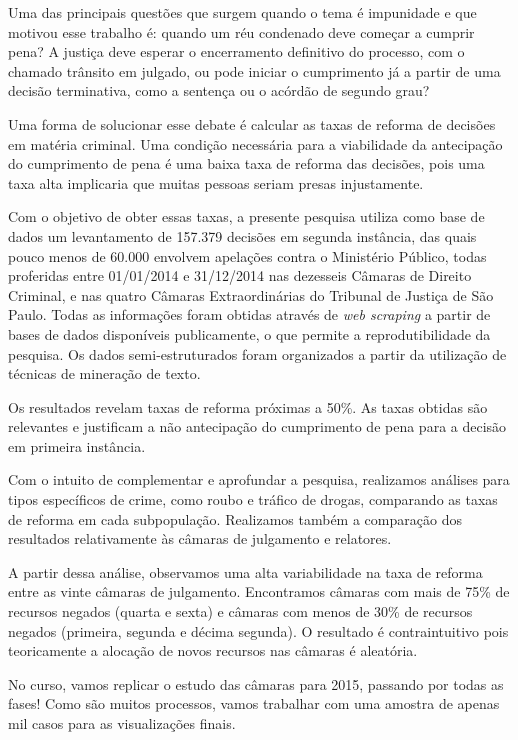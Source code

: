 \documentclass[]{book}
\begin{document}
Uma das principais questões que surgem quando o tema é impunidade e que
motivou esse trabalho é: quando um réu condenado deve começar a cumprir
pena? A justiça deve esperar o encerramento definitivo do processo, com
o chamado trânsito em julgado, ou pode iniciar o cumprimento já a partir
de uma decisão terminativa, como a sentença ou o acórdão de segundo
grau?

Uma forma de solucionar esse debate é calcular as taxas de reforma de
decisões em matéria criminal. Uma condição necessária para a viabilidade
da antecipação do cumprimento de pena é uma baixa taxa de reforma das
decisões, pois uma taxa alta implicaria que muitas pessoas seriam presas
injustamente.

Com o objetivo de obter essas taxas, a presente pesquisa utiliza como
base de dados um levantamento de 157.379 decisões em segunda instância,
das quais pouco menos de 60.000 envolvem apelações contra o Ministério
Público, todas proferidas entre 01/01/2014 e 31/12/2014 nas dezesseis
Câmaras de Direito Criminal, e nas quatro Câmaras Extraordinárias do
Tribunal de Justiça de São Paulo. Todas as informações foram obtidas
através de \emph{web scraping} a partir de bases de dados disponíveis
publicamente, o que permite a reprodutibilidade da pesquisa. Os dados
semi-estruturados foram organizados a partir da utilização de técnicas
de mineração de texto.

Os resultados revelam taxas de reforma próximas a 50\%. As taxas obtidas
são relevantes e justificam a não antecipação do cumprimento de pena
para a decisão em primeira instância.

Com o intuito de complementar e aprofundar a pesquisa, realizamos
análises para tipos específicos de crime, como roubo e tráfico de
drogas, comparando as taxas de reforma em cada subpopulação. Realizamos
também a comparação dos resultados relativamente às câmaras de
julgamento e relatores.

A partir dessa análise, observamos uma alta variabilidade na taxa de
reforma entre as vinte câmaras de julgamento. Encontramos câmaras com
mais de 75\% de recursos negados (quarta e sexta) e câmaras com menos de
30\% de recursos negados (primeira, segunda e décima segunda). O
resultado é contraintuitivo pois teoricamente a alocação de novos
recursos nas câmaras é aleatória.

No curso, vamos replicar o estudo das câmaras para 2015, passando por
todas as fases! Como são muitos processos, vamos trabalhar com uma
amostra de apenas mil casos para as visualizações finais.
\end{document}
